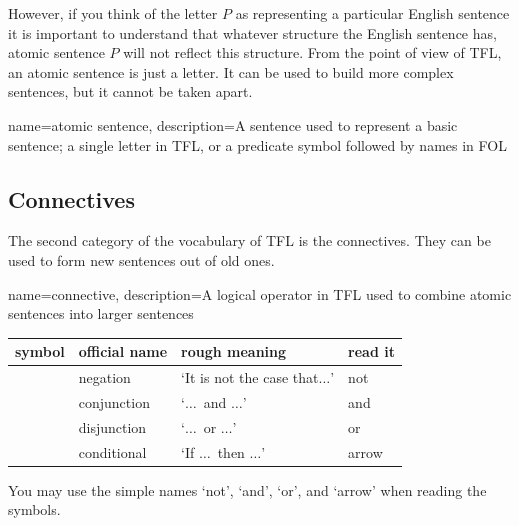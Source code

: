 However, if you think of the letter $P$ as representing a particular English sentence it is important to understand that whatever structure the English sentence has, atomic sentence $P$ will not reflect this structure. From the point of view of TFL, an atomic sentence is just a letter. It can be used to build more complex sentences, but it cannot be taken apart.

{
name=atomic sentence,
description={A sentence used to represent a basic sentence; a single letter in TFL, or a predicate symbol followed by names in FOL}
}

\subsection{Connectives}
\label{sec:TFLConnectives}

The second category of the vocabulary of TFL is the connectives. They can be used to form new sentences out of old ones.

{
name=connective,
description={A logical operator in TFL used to combine \glspl{atomic sentence} into larger sentences}
}
	\begin{table}[h]
	\center
	\begin{tabular}{l l ll}
		
		\textbf{symbol}&\textbf{official name}&\textbf{rough meaning}&\textbf{read it}\\
		\hline
		\enot&negation&`It is not the case that$\ldots$'&not\\
		\eand&conjunction&`$\ldots$\ and $\ldots$'&and \\
		\eor&disjunction&`$\ldots$\ or $\ldots$'&or \\
		\eif&conditional&`If $\ldots$\ then $\ldots$'&arrow\\
		
	\end{tabular}
\end{table}

You may use the simple names `not', `and', `or', and `arrow' when reading the symbols. 



